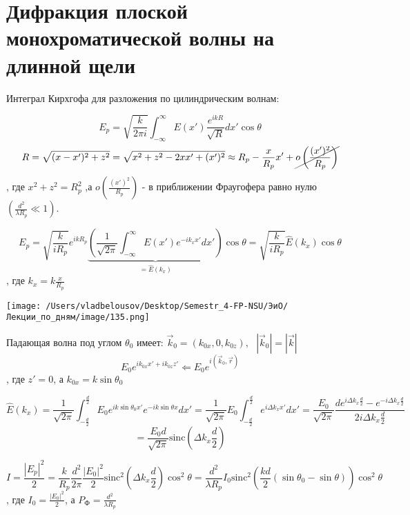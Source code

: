 \documentclass[12pt, a4paper]{report}
\begin{document}
\fi




\section{Дифракция плоской монохроматической волны на длинной щели}

Интеграл Кирхгофа для разложения по цилиндрическим волнам:

\[ E_p = \sqrt{\frac{k}{2 \pi i } } \int_{-\infty}^{\infty}   E(x' ) \frac{e^{i k R } }{\sqrt{R}} d x ' \cos \theta  \] 
\[ R = \sqrt{(x -x ' ) ^2 + z ^2 } = \sqrt{x ^2 + z ^2 - 2 x x' + (x' ) ^2 } \approx R_p -\frac{x}{R_p }x '      + \cancel{ o\left( \frac{(x') ^2 }{R_p}  \right)} \] 
, где \( x ^2+ z ^2 = R_p ^2  \) ,а \( o\left( \displaystyle \frac{(x') ^2 }{R_p}  \right) \) - в приближении Фраугофера равно нулю \( \left( \displaystyle  \frac{d ^2 }{\lambda R_p } \ll 1  \right) \).

\[ E_p = \sqrt{\frac{k}{ i R_p} } e^{ i k R_p } \underbrace{\left( \frac{1}{\sqrt{2 \pi } } \int_{-\infty}^{\infty}  E(x' ) e^{ - i k_x x ' } dx '    \right)}_{= \hat{E } (k_x)} \cos  \theta = \sqrt{\frac{k}{i R_p } } \hat{E } (k_x )\cos \theta  \] 
, где \( \displaystyle  k_x = k \frac{x}{R_p}  \) 

\begin{center}
    \texttt{[image: /Users/vladbelousov/Desktop/Semestr\_4-FP-NSU/ЭиО/Лекции\_по\_дням/image/135.png]}
\end{center}
Падающая волна  под углом \( \theta_0 \)  имеет: \( \vec{k }_0  = (k_{0x } , 0 , k_{0z} ) , \text{ }  |\vec{k } _0   | = |\vec{k } | \) 
\[ E_0 e^{ ik_{0x }x'  + i k_{0z } z'  }  \Leftarrow E_0 e^{i (\vec{k } _0 , \vec{r} )} \] 
, где \( z ' = 0 \), а \( k_{0x} = k \sin \theta_0  \) 

\[ \hat{E } (k_x ) = \frac{1}{\sqrt{2 \pi}} \int_{- \frac{d}{2 } }^{\frac{d}{2 }  } E_0 e^{ i k \sin \theta_0 x' } e^{ - ik \sin \theta x } d x' = \frac{1}{\sqrt{2 \pi}}    E_0 \int_{- \frac{d}{2 } }^{\frac{d}{2 }  } e^{ i \Delta k_x x' }dx ' = \frac{ E_0}{\sqrt{ 2 \pi } } \frac{d e^{ i \Delta k_x \frac{d}{2 } }- e^{ - i \Delta k_x \frac{d}{2 } }  }{2 i \Delta k_x \frac{d}{2} }   \] 
\[=\frac{E_0 d }{\sqrt{2 \pi }}  \mathrm{sinc } \left( \Delta k_x \frac{d}{2 }  \right)  \] 

\[ I = \frac{\left\lvert  E_p    \right\rvert ^2 }{2 } = \frac{k }{R_p } \frac{ d ^2 }{2 \pi } \frac{\left\lvert E_0  \right\rvert ^2}{2 } \mathrm{sinc } ^2 \left( \Delta k_x \frac{d}{2 }  \right) \cos ^2 \theta =      \frac{ d ^2 }{\lambda R_p } I_0 \mathrm{sinc } ^2 \left(  \frac{kd }{2 }  (\sin \theta_0 - \sin \theta) \right)  \cos  ^2 \theta \] 
, где \( \displaystyle  I_0 = \frac{\left\lvert E_0  \right\rvert ^2}{2}  \), а \(\displaystyle  P_{\text{Ф} } = \frac{d ^2 }{ \lambda R_p}   \) 
\end{document}
